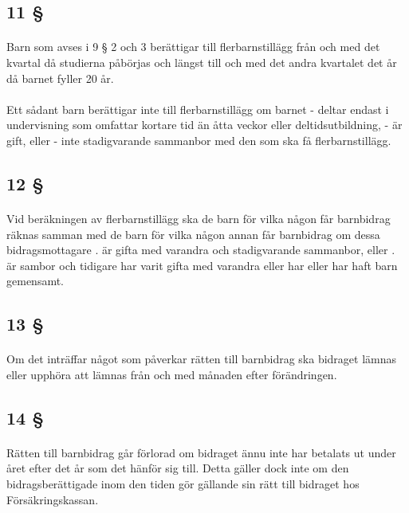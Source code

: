 \documentclass[a4paper,notitlepage,openany,10pt]{book}
\begin{document}
\subsection*{11 §}
\paragraph*{}
Barn som avses i 9 § 2 och 3 berättigar till flerbarnstillägg från och med det kvartal då studierna påbörjas och längst till och med det andra kvartalet det år då barnet fyller 20 år.
\paragraph*{}
Ett sådant barn berättigar inte till flerbarnstillägg om barnet
\newline - deltar endast i undervisning som omfattar kortare tid än åtta veckor eller deltidsutbildning,
\newline - är gift, eller
\newline - inte stadigvarande sammanbor med den som ska få flerbarnstillägg.
\subsection*{12 §}
\paragraph*{}
Vid beräkningen av flerbarnstillägg ska de barn för vilka någon får barnbidrag räknas samman med de barn för vilka någon annan får barnbidrag om dessa bidragsmottagare
. är gifta med varandra och stadigvarande sammanbor, eller
. är sambor och tidigare har varit gifta med varandra eller har eller har haft barn gemensamt.
\subsection*{13 §}
\paragraph*{}
Om det inträffar något som påverkar rätten till barnbidrag ska bidraget lämnas eller upphöra att lämnas från och med månaden efter förändringen.
\subsection*{14 §}
\paragraph*{}
Rätten till barnbidrag går förlorad om bidraget ännu inte har betalats ut under året efter det år som det hänför sig till. Detta gäller dock inte om den bidragsberättigade inom den tiden gör gällande sin rätt till bidraget hos Försäkringskassan.
\end{document}
